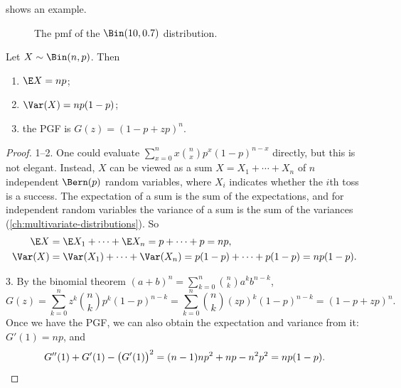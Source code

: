  shows an example.

\begin{figure}[ht]
\centering
{}
\caption{The pmf of the $\Bin(10, 0.7)$ distribution.}
\label{fig:binomial-pmf}
\end{figure}


\begin{theorem}\label{thm:binomial-properties}
Let $X \sim \Bin(n, p)$. Then
\begin{enumerate}
  \item $\E X = np$;
  \item $\Var(X) = np(1-p)$;
  \item the PGF is $G(z) = (1 - p + zp)^n$.
\end{enumerate}
\end{theorem}

\begin{proof}
1--2. One could evaluate $\sum_{x=0}^n x \binom{n}{x} p^x (1-p)^{n-x}$ directly, but this is not elegant. Instead, $X$ can be viewed as a sum $X = X_1 + \cdots + X_n$ of $n$ independent $\Bern(p)$ random variables, where $X_i$ indicates whether the $i$th toss is a success. The expectation of a sum is the sum of the expectations, and for independent random variables the variance of a sum is the sum of the variances (\cref{ch:multivariate-distributions}). So
\begin{align*}
  \E X &= \E X_1 + \cdots + \E X_n = p + \cdots + p = np, \\
  \Var(X) &= \Var(X_1) + \cdots + \Var(X_n) = p(1-p) + \cdots + p(1-p) = np(1-p).
\end{align*}

3. By the binomial theorem $(a + b)^n = \sum_{k=0}^n \binom{n}{k} a^k b^{n-k}$,
\[
  G(z) = \sum_{k=0}^n z^k \binom{n}{k} p^k (1-p)^{n-k} = \sum_{k=0}^n \binom{n}{k} (zp)^k (1-p)^{n-k} = (1 - p + zp)^n.
\]
Once we have the PGF, we can also obtain the expectation and variance from it: $G'(1) = np$, and
\[
  G''(1) + G'(1) - \bigl(G'(1)\bigr)^2 = (n-1)np^2 + np - n^2p^2 = np(1-p). \qedhere
\]
\end{proof}

